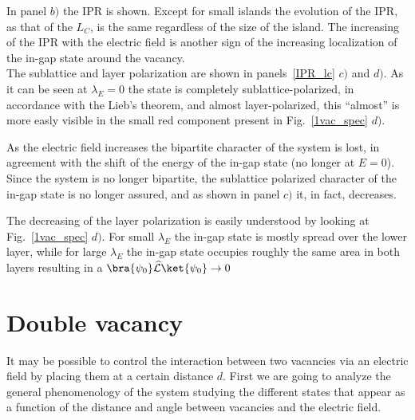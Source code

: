In panel $b)$ the IPR is shown. Except for small islands the evolution of the IPR, as that of the $L_C$, is the same regardless of the size of the island. The increasing of the IPR with the electric field is another sign of the increasing localization of the in-gap state around the vacancy.\\

The sublattice and layer polarization are shown in panels~\ref{IPR_lc} $c)$ and $d)$. As it can be seen at $\lambda_E=0$ the state is completely sublattice-polarized, in accordance with the Lieb's theorem, and almost layer-polarized, this ``almost'' is more easly visible in the small red component present in Fig.~\ref{1vac_spec} $d)$.

As the electric field increases the bipartite character of the system is lost, in agreement with the shift of the energy of the in-gap state (no longer at $E=0$). Since the system is no longer bipartite, the sublattice polarized character of the in-gap state is no longer assured, and as shown in panel $c)$ it, in fact, decreases.

The decreasing of the layer polarization is easily understood by looking at Fig.~\ref{1vac_spec} $d)$. For small $\lambda_E$ the in-gap state is mostly spread over the lower layer, while for large $\lambda_E$ the in-gap state occupies roughly the same area in both layers resulting in a $\bra{\psi_0}\widehat{\mathcal{L}}\ket{\psi_0} \rightarrow 0$




\section{Double vacancy}
It may be possible to control the interaction between two vacancies via an electric field by placing them at a certain distance $d$. First we are going to analyze the general phenomenology of the system studying the different states that appear as a function of the distance and angle between vacancies and the electric field.

